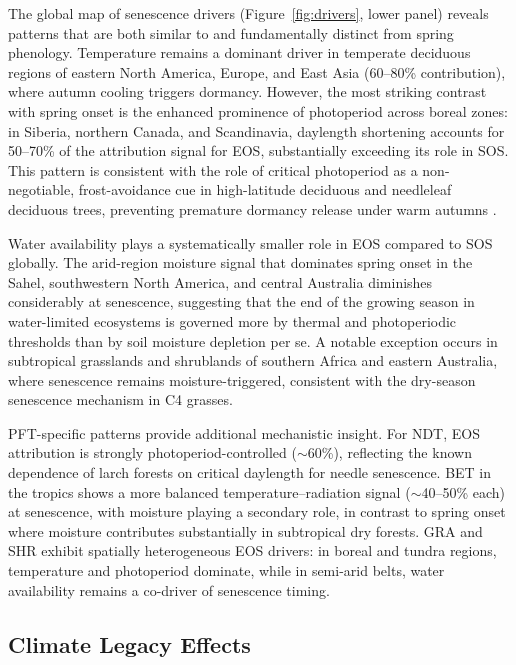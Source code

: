 \documentclass[pdflatex,sn-mathphys-num]{sn-jnl}%
\theoremstyle{thmstyleone}%
\theoremstyle{thmstyletwo}%
\theoremstyle{thmstylethree}%
\begin{document}
The global map of senescence drivers (Figure~\ref{fig:drivers}, lower panel) reveals patterns that are both similar to and fundamentally distinct from spring phenology. Temperature remains a dominant driver in temperate deciduous regions of eastern North America, Europe, and East Asia (60–80\% contribution), where autumn cooling triggers dormancy. However, the most striking contrast with spring onset is the enhanced prominence of photoperiod across boreal zones: in Siberia, northern Canada, and Scandinavia, daylength shortening accounts for 50–70\% of the attribution signal for EOS, substantially exceeding its role in SOS. This pattern is consistent with the role of critical photoperiod as a non-negotiable, frost-avoidance cue in high-latitude deciduous and needleleaf deciduous trees, preventing premature dormancy release under warm autumns \citep{fu_editorial_2022}.

Water availability plays a systematically smaller role in EOS compared to SOS globally. The arid-region moisture signal that dominates spring onset in the Sahel, southwestern North America, and central Australia diminishes considerably at senescence, suggesting that the end of the growing season in water-limited ecosystems is governed more by thermal and photoperiodic thresholds than by soil moisture depletion per se. A notable exception occurs in subtropical grasslands and shrublands of southern Africa and eastern Australia, where senescence remains moisture-triggered, consistent with the dry-season senescence mechanism in C4 grasses.

PFT-specific patterns provide additional mechanistic insight. For NDT, EOS attribution is strongly photoperiod-controlled ($\sim$60\%), reflecting the known dependence of larch forests on critical daylength for needle senescence. BET in the tropics shows a more balanced temperature--radiation signal ($\sim$40--50\% each) at senescence, with moisture playing a secondary role, in contrast to spring onset where moisture contributes substantially in subtropical dry forests. GRA and SHR exhibit spatially heterogeneous EOS drivers: in boreal and tundra regions, temperature and photoperiod dominate, while in semi-arid belts, water availability remains a co-driver of senescence timing.

\subsection{Climate Legacy Effects}\label{subsec2}
\end{document}
